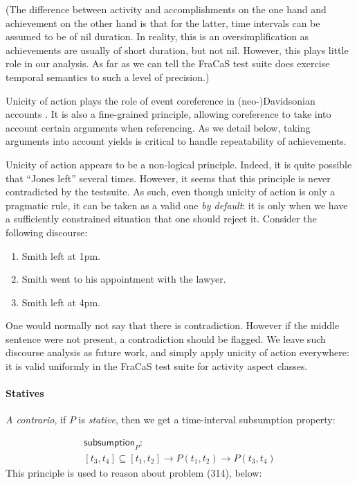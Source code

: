 \documentclass[a4paper,twoside]{article}
\newcommand\constant[1]{\mathsf{#1}}
\begin{document}
(The difference between activity and accomplishments on the one hand and
achievement on the other hand is that for the latter, time intervals
can be assumed to be of nil duration. In reality, this is an
oversimplification as achievements are usually of short duration, but
not nil. However, this plays little role in our
analysis. As far as we can tell the FraCaS test suite does exercise temporal semantics to
such a level of precision.)

Unicity of action plays the role of event coreference in
(neo-)Davidsonian accounts \citep{parsons1990events}. It is also a fine-grained
principle, allowing coreference to take into account certain arguments
when referencing. As we detail below, taking arguments into account
yields is critical to handle repeatability of achievements.

Unicity of action appears to be a non-logical principle. Indeed, it is
quite possible that ``Jones left'' several times. However, it seems
that this principle is never contradicted by the testsuite. As such,
even though unicity of action is only a pragmatic rule, it can be
taken as a valid one \emph{by default}: it is only when we have a
sufficiently constrained situation that one should reject it. Consider
the following discourse:
\begin{enumerate}[parsep=0pt,itemsep=1pt,label=(\arabic*)]
\item Smith left at 1pm.
\item Smith went to his appointment with the lawyer.
\item Smith left at 4pm.
\end{enumerate}
One would normally not say that there is contradiction. However if the
middle sentence were not present, a contradiction should be
flagged. We leave such discourse analysis as future work, and simply
apply unicity of action everywhere: it is valid uniformly in the
FraCaS test suite for activity aspect classes.


\paragraph{Statives}
\textit{A contrario}, if \(P\) is \emph{stative}, then we get a time-interval subsumption property:

\begin{multline*}
\constant {subsumption}_P :\\ [t_3,t_4] ⊆ [t_1,t_2] → P (t_1,t_2) → P (t_3,t_4)
\end{multline*}
This principle is used to reason about problem (314), below:
\end{document}
